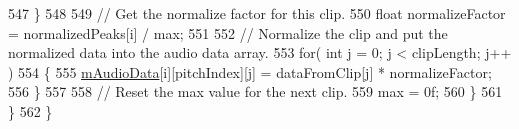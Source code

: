 \begin{DoxyCode}
547                 \}
548 
549                 \textcolor{comment}{// Get the normalize factor for this clip.}
550                 \textcolor{keywordtype}{float} normalizeFactor = normalizedPeaks[i] / max;
551 
552                 \textcolor{comment}{// Normalize the clip and put the normalized data into the audio data array.}
553                 \textcolor{keywordflow}{for}( \textcolor{keywordtype}{int} j = 0; j < clipLength; j++ )
554                 \{
555                     \hyperlink{group___v_i_base_pro_var_ga52e76d9b74408660584676035a92a2c6}{mAudioData}[i][pitchIndex][j] = dataFromClip[j] * normalizeFactor;
556                 \}
557 
558                 \textcolor{comment}{// Reset the max value for the next clip.}
559                 max = 0f;
560             \}
561         \}
562     \}
\end{DoxyCode}
